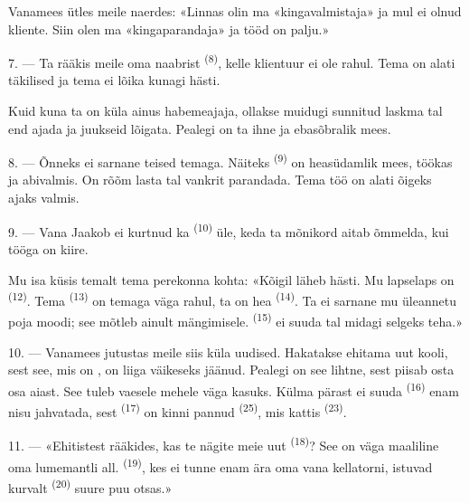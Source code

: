 Vanamees ütles meile naerdes: «Linnas olin ma «kingavalmistaja» ja mul ei olnud
kliente. Siin olen ma «kingaparandaja» ja tööd on palju.»

7. --- Ta rääkis meile oma naabrist  \textsuperscript{(8)}, kelle
klientuur ei ole rahul. Tema  on alati täkilised ja tema
 ei lõika kunagi hästi.

Kuid kuna ta on küla ainus habemeajaja, ollakse muidugi sunnitud laskma tal end ajada
ja juukseid lõigata. Pealegi on ta ihne ja ebasõbralik mees.

8. --- Õnneks ei sarnane teised  temaga. Näiteks 
\textsuperscript{(9)} on heasüdamlik mees, töökas ja abivalmis. On rõõm lasta tal
vankrit parandada. Tema töö on alati õigeks ajaks valmis.

9. --- Vana Jaakob ei kurtnud ka  \textsuperscript{(10)} üle, keda ta
mõnikord aitab  õmmelda, kui tööga on kiire.

Mu isa küsis temalt tema perekonna kohta: «Kõigil läheb hästi. Mu lapselaps on
 \textsuperscript{(12)}. Tema  \textsuperscript{(13)} on
temaga väga rahul, ta on hea  \textsuperscript{(14)}. Ta ei sarnane mu
üleannetu poja moodi; see mõtleb ainult mängimisele. 
\textsuperscript{(15)} ei suuda tal midagi selgeks teha.»

\VUsaut{3.0mm}
\VUsaut{3.0mm}

10. --- Vanamees jutustas meile siis küla uudised. Hakatakse ehitama uut kooli, sest
see, mis on , on liiga väikeseks jäänud. Pealegi on see lihtne, sest
piisab osta osa  aiast. See tuleb vaesele mehele väga kasuks. Külma
pärast ei suuda  \textsuperscript{(16)}  enam nisu
jahvatada, sest  \textsuperscript{(17)} on kinni pannud 
\textsuperscript{(25)}, mis kattis  \textsuperscript{(23)}.

11. --- «Ehitistest rääkides, kas te nägite meie uut 
\textsuperscript{(18)}? See on väga maaliline oma lumemantli all. 
\textsuperscript{(19)}, kes ei tunne enam ära oma vana kellatorni, istuvad kurvalt
 \textsuperscript{(20)} suure puu otsas.»

